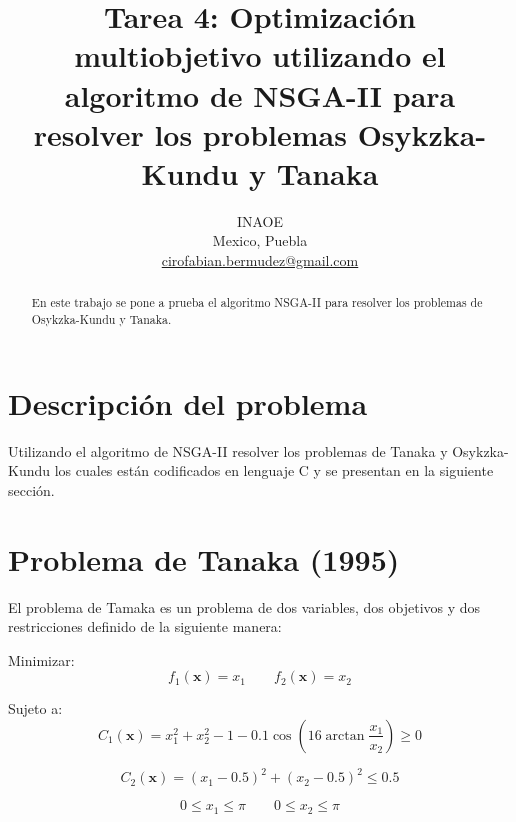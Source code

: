\documentclass[conference]{IEEEtran}
\begin{document}
\title{Tarea 4: Optimización multiobjetivo utilizando el algoritmo de NSGA-II para resolver los problemas Osykzka-Kundu y Tanaka
}

\author{
INAOE\\
Mexico, Puebla \\
\url{cirofabian.bermudez@gmail.com}
}

\maketitle

\begin{abstract}
En este trabajo se pone a prueba el algoritmo NSGA-II para resolver los problemas de Osykzka-Kundu y Tanaka.
\end{abstract}



\section{Descripción del problema}

Utilizando el algoritmo de NSGA-II resolver los problemas de Tanaka y Osykzka-Kundu los cuales están codificados en lenguaje C y se presentan en la siguiente sección.


\section{Problema de Tanaka (1995)}
El problema de Tamaka es un problema de dos variables, dos objetivos y dos restricciones definido de la siguiente manera:

Minimizar:
\begin{equation}
f_{1}(\mathbf{x}) = x_{1} \qquad f_{2}(\mathbf{x}) = x_{2}
\end{equation}

Sujeto a:
\begin{equation}
C_{1}(\mathbf{x})  = x_{1}^{2} + x_{2}^{2} - 1 - 0.1 \cos \left(  16 \arctan \frac{x_{1}}{x_{2}}\right) \geq 0  
\end{equation}

\begin{equation}
C_{2}(\mathbf{x})  = (x_{1} -0.5)^{2} + (x_{2} -0.5)^{2}  \leq 0.5 
\end{equation}

\begin{equation}
0 \leq x_{1} \leq \pi \qquad 0 \leq x_{2} \leq \pi
\end{equation}
\end{document}
